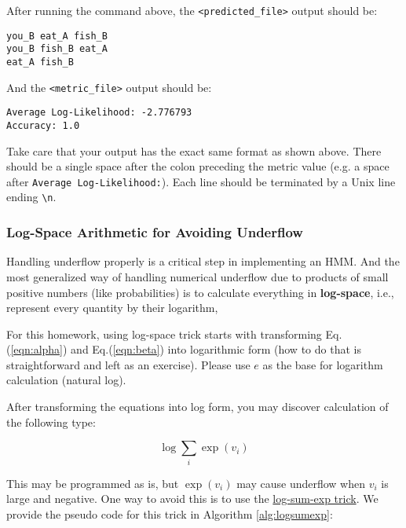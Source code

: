 \documentclass[11pt,addpoints,answers]{exam}
\numberwithin{equation}{section} %
\numberwithin{figure}{section} %
\numberwithin{table}{section} %
\begin{document}
After running the command above, the \texttt{<predicted\_file>} output should be:

\begin{lstlisting}
you_B eat_A fish_B
you_B fish_B eat_A
eat_A fish_B
\end{lstlisting}

And the \texttt{<metric\_file>} output should be:

\begin{lstlisting}
Average Log-Likelihood: -2.776793
Accuracy: 1.0
\end{lstlisting}

Take care that your output has the exact same format as shown above. There should be a single space after the colon preceding the metric value (e.g. a space after \lstinline{Average Log-Likelihood:}). Each line should be terminated by a Unix line ending \lstinline{\n}.



\subsubsection{Log-Space Arithmetic for Avoiding Underflow}
\label{sec:underflow}

Handling underflow properly is a critical step in implementing an HMM. And the most generalized way of handling numerical underflow due to products of small positive numbers (like probabilities) is to calculate everything in \textbf{log-space}, i.e., represent every quantity by their logarithm, 

For this homework, using log-space trick starts with transforming Eq.(\ref{eqn:alpha}) and Eq.(\ref{eqn:beta}) into logarithmic form (how to do that is straightforward and left as an exercise). Please use $e$ as the base for logarithm calculation (natural log).

After transforming the equations into log form, you may discover calculation of the following type:

$$ \log \sum_i \exp{(v_i)}$$

This may be programmed as is, but $\exp{(v_i)}$ may cause underflow when $v_i$ is large and negative. One way to avoid this is to use the \href{https://www.xarg.org/2016/06/the-log-sum-exp-trick-in-machine-learning/}{log-sum-exp trick}. We provide the pseudo code for this trick in Algorithm \ref{alg:logsumexp}:
\end{document}
